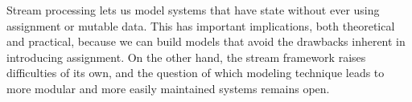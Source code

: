 Stream processing lets us model systems that have state without ever using assignment or mutable data.
This has important implications, both theoretical and practical, because we can build models that avoid the drawbacks inherent in introducing assignment.
On the other hand, the stream framework raises difficulties of its own, and the question of which modeling technique leads to more modular and more easily maintained systems remains open.






